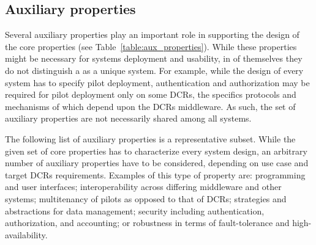 \documentclass{sig-alternate}
\begin{document}
\begin{itemize}

\end{itemize}

%
\subsection{Auxiliary properties}
\label{sec:auxprops}

Several auxiliary properties play an important role in supporting the design of
the core properties (see Table~\ref{table:aux_properties}). While these
properties might be necessary for \pilot systems deployment and usability, in of
themselves they do not distinguish a \pilot as a unique system. For example,
while the design of every \pilot system has to specify pilot deployment,
authentication and authorization may be required for pilot deployment only on
some DCRs, the specifics protocols and mechanisms of which depend upon the DCRs
middleware. As such, the set of auxiliary properties are not necessarily shared
among all \pilot systems.


The following list of auxiliary properties is a representative subset. While the
given set of core properties has to characterize every \pilot system design, an
arbitrary number of auxiliary properties have to be considered, depending on use
case and target DCRs requirements. Examples of this type of property are:
programming and user interfaces; interoperability across differing middleware
and other \pilot systems; multitenancy of pilots as opposed to that of DCRs;
strategies and abstractions for data management; security including
authentication, authorization, and accounting; or robustness in terms of
fault-tolerance and high-availability.
\end{document}
